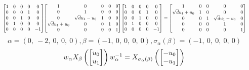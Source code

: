 \documentclass[11pt]{article}
\theoremstyle{definition}
\begin{document}
\[
\scaletoalign{\textwidth}{{\left[\begin{matrix}1 & 0 & 0 & 0 & 0\\0 & 0 & 0 & 1 & 0\\0 & 0 & 1 & 0 & 0\\0 & 1 & 0 & 0 & 0\\0 & 0 & 0 & 0 & -1\end{matrix}\right]} {\left[\begin{matrix}1 & 0 & 0 & 0 & 0\\0 & 1 & 0 & 0 & 0\\0 & \sqrt{d} u_{1} - u_{0} & 1 & 0 & 0\\\sqrt{d} u_{1} + u_{0} & 0 & 0 & 1 & 0\\0 & 0 & 0 & 0 & 1\end{matrix}\right]} {\left[\begin{matrix}1 & 0 & 0 & 0 & 0\\0 & 0 & 0 & 1 & 0\\0 & 0 & 1 & 0 & 0\\0 & 1 & 0 & 0 & 0\\0 & 0 & 0 & 0 & -1\end{matrix}\right]} = {\left[\begin{matrix}1 & 0 & 0 & 0 & 0\\\sqrt{d} u_{1} + u_{0} & 1 & 0 & 0 & 0\\0 & 0 & 1 & \sqrt{d} u_{1} - u_{0} & 0\\0 & 0 & 0 & 1 & 0\\0 & 0 & 0 & 0 & 1\end{matrix}\right]}}
\]
\[
\alpha = \left( 0, \  -2, \  0, \  0, \  0\right), \beta = \left( -1, \  0, \  0, \  0, \  0\right), \sigma_{\alpha}(\beta) = \left( -1, \  0, \  0, \  0, \  0\right)
\]
\[
\scaletoalign{\textwidth}{w_{\alpha} X_{\beta}\left(\left[\begin{matrix}u_{0}\\u_{1}\end{matrix}\right]\right) w_{\alpha}^{-1} = X_{\sigma_{\alpha}\left(\beta\right)}\left(\left[\begin{matrix}- u_{0}\\- u_{1}\end{matrix}\right]\right)}
\]
\end{document}
